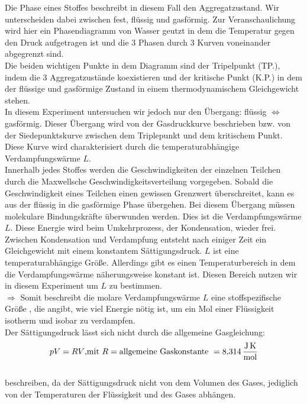 Die \glqq Phase\grqq{} eines Stoffes beschreibt in diesem Fall den Aggregatzustand. Wir unterscheiden dabei zwischen fest, flüssig und gasförmig.
Zur Veranschaulichung wird hier ein Phasendiagramm von Wasser geutzt in dem die Temperatur gegen den Druck aufgetragen ist und die 3 \glqq Phasen\grqq{}
durch 3 Kurven voneinander abgegrenzt sind.\\
Die beiden wichtigen Punkte in dem Diagramm sind der Tripelpunkt (TP.), indem die 
3 Aggregatzustände koexistieren und der kritische Punkt (K.P.) in dem der flüssige und gasförmige Zustand in einem 
thermodynamischem Gleichgewicht stehen.\\
In diesem Experiment untersuchen wir jedoch nur den Übergang: flüssig $\Leftrightarrow$ gasförmig. 
Dieser Übergang wird von der Gasdruckkurve beschrieben bzw. von der Siedepunktskurve zwischen dem Triplepunkt und dem kritischem Punkt.
Diese Kurve wird charakterisiert durch die temperaturabhängige Verdampfungswärme $L$. \\
Innerhalb jedes Stoffes werden die Geschwindigkeiten der einzelnen Teilchen
durch die Maxwellsche Geschwindigkeitsverteilung vorgegeben. Sobald die Geschwindigkeit eines Teilchen einen gewissen Grenzwert 
überschreitet, kann es aus der flüssig in die gasförmige Phase übergehen. Bei diesem Übergang müssen molekulare Bindungskräfte überwunden
werden. Dies ist die Verdampfungswärme $L$. Diese Energie wird beim Umkehrprozess, der Kondensation, wieder frei.\\
Zwischen Kondensation und Verdampfung entsteht nach einiger Zeit ein Gleichgewicht mit einem konstantem Sättigungsdruck.
$L$ ist eine temperaturabhängige Größe. Allerdings gibt es einen Temperaturbereich in dem die Verdampfungswärme näherungsweise konstant ist.
Diesen Bereich nutzen wir in diesem Experiment um $L$ zu bestimmen.
\\$\Rightarrow$ Somit beschreibt die molare Verdampfungswärme $L$ eine stoffspezifische Größe , die angibt, wie viel Energie nötig ist,
um ein Mol einer Flüssigkeit isotherm und isobar zu verdampfen.\\
Der Sättigungsdruck lässt sich nicht durch die allgemeine Gasgleichung:
\begin{equation}
    pV=RV\text{,mit }R=\text{allgemeine Gaskonstante }= \SI{8.314}{\joule\per\mole\kelvin}\\
    \label{eqn:Gasgl}
\end{equation}
\\
beschreiben, da der Sättigungsdruck nicht von dem Volumen des Gases, jediglich von der Temperaturen der Flüssigkeit 
und des Gases abhängen.

